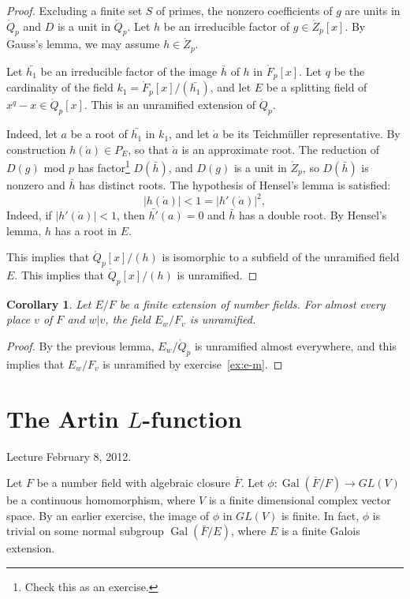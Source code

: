 \documentclass{amsart}
\newtheorem{corollary}[equation]{Corollary}
\def\op#1{{\operatorname{#1}}}
\def\oG{\op{Gal}}
\begin{document}
\begin{proof} 
  Excluding a finite set $S$ of primes, the nonzero coefficients of
  $g$ are units in $\ring{Q}_p$ and $D$ is a unit in $\ring{Q}_p$.
  Let $h$ be an irreducible factor of $g\in\ring{Z}_p[x]$.  By
  Gauss's lemma, we may assume $h\in \ring{Z}_p$.

  Let $\bar{h_1}$ be an irreducible factor of the image $\bar{h}$ of
  $h$ in $\ring{F}_p[x]$.  Let $q$ be the cardinality of the field
  $k_1=\ring{F}_p[x]/(\bar{h_1})$, and let $E$ be a splitting field of
  $x^q - x\in\ring{Q}_p[x]$.  This is an unramified extension of
  $\ring{Q}_p$.

   Indeed, let $a$ be
  a root of $\bar{h_1}$ in $k_1$, and let $\dot a$ be its Teichm\"uller representative.
  By construction $h(\dot a)\in P_E$, so that $\dot a$ is an approximate root.  
  The reduction of $D(g)$ mod $p$ has factor\footnote{Check this as an exercise.} 
$D(\bar{h})$, and $D(g)$ is a unit in
  $\ring{Z}_p$, so $D(\bar{h})$ is nonzero and $\bar{h}$ has distinct roots.
  The hypothesis of Hensel's lemma is satisfied:
  \[
  |h(\dot a)| < 1 = |h'(\dot a)|^2,
  \]
  Indeed, if $|h'(\dot a)|<1$, then $\bar{h'}(a)=0$ and $\bar{h}$ has a double root.
  By Hensel's lemma, $h$ has a root in $E$.  
  
  This implies that $\ring{Q}_p[x]/(h)$ is isomorphic to a subfield of the unramified
  field $E$.  This implies that $\ring{Q}_p[x]/(h)$ is unramified.  
\end{proof}

\begin{corollary} Let $E/F$ be a finite extension of number fields.  For
almost every place $v$ of $F$ and $w|v$, the field $E_w/F_v$ is unramified.
\end{corollary}

\begin{proof}  By the previous lemma, $E_w/\ring{Q}_p$ is unramified almost
everywhere, and this implies that $E_w/F_v$ is unramified by exercise~\ref{ex:e-m}.
\end{proof}

\newpage
\section{The Artin $L$-function}

Lecture February 8, 2012.

Let $F$ be a number field with algebraic closure $\bar{F}$.  Let
$\phi:\oG(\bar{F}/F)\to GL(V)$ be a continuous homomorphism,
where $V$ is a finite dimensional complex vector space.  By an earlier
exercise, the image of $\phi$ in $GL(V)$ is finite.  In fact, $\phi$
is trivial on some normal subgroup $\oG(\bar{F}/E)$, where $E$ is
a finite Galois extension.
\end{document}
